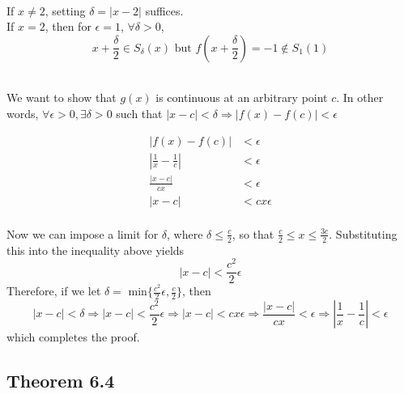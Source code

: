 \begin{solution}
 \\If $x\neq2$, setting $\delta = |x-2|$ suffices. \\
 If $x=2$, then for $\epsilon = 1$, $\forall \delta > 0$,
 $$x + \frac{\delta}{2} \in S_\delta(x) \text{ but } f\left(x + \frac{\delta}{2}\right) = -1 \notin S_1(1)$$
\end{solution}


\begin{solution}
 \\We want to show that $g(x)$ is continuous at an arbitrary point $c$. In other words, $\forall \epsilon > 0, \exists \delta > 0$ such that $|x-c| < \delta \Rightarrow |f(x)-f(c)| < \epsilon$
 
\begin{align*}
 |f(x)-f(c)| &< \epsilon \\
 \left|\frac{1}{x} - \frac{1}{c}\right| &< \epsilon \\
 \frac{|x-c|}{cx} &< \epsilon \\
 |x-c| &< cx\epsilon \\
\end{align*}

Now we can impose a limit for $\delta$, where $\delta \leq \frac{c}{2}$, so that $\frac{c}{2} \leq x \leq \frac{3c}{2}$. Substituting this into the inequality above yields
$$|x-c| < \frac{c^2}{2} \epsilon$$
Therefore, if we let $\delta =$ min$\{\frac{c^2}{2}\epsilon,\frac{c}{2}\}$, then
$$|x-c| < \delta \Rightarrow |x-c| < \frac{c^2}{2} \epsilon \Rightarrow |x-c| < cx\epsilon \Rightarrow \frac{|x-c|}{cx} < \epsilon \Rightarrow \left|\frac{1}{x} - \frac{1}{c}\right| < \epsilon$$
which completes the proof.
\end{solution}

\subsection{Theorem 6.4} \label{thm3.6.4}



